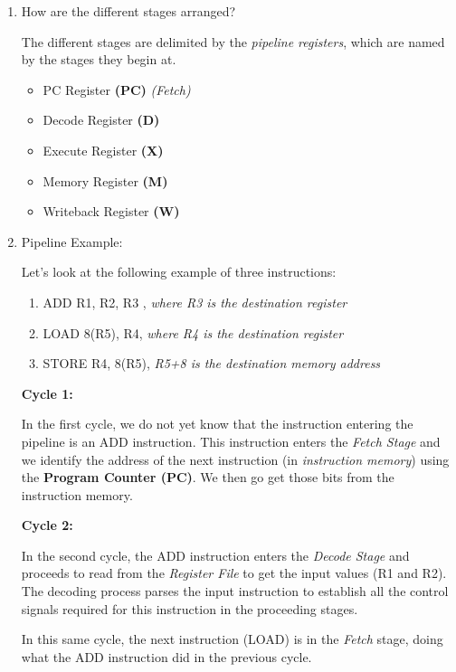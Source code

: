 \documentclass[12pt]{article}
\newenvironment{QandA}{\begin{enumerate}[label=\bfseries\alph*.]\bfseries}
                      {\end{enumerate}}
\newenvironment{answered}{\par\quad\normalfont}{}
\begin{document}
\begin{QandA}
    \item How are the different stages arranged?
    \begin{answered}
    The different stages are delimited by the \textit{pipeline registers}, which are named by the stages they begin at.
    \begin{itemize}
        \item PC Register \textbf{(PC)} \textit{(Fetch)}
        \item Decode Register \textbf{(D)}
        \item Execute Register \textbf{(X)}
        \item Memory Register \textbf{(M)}
        \item Writeback Register \textbf{(W)}
    \end{itemize}
    \end{answered}
    
    \item Pipeline Example:
    \begin{answered}
    Let's look at the following example of three instructions:
    \begin{enumerate}
        \item ADD R1, R2, R3 , \textit{where R3 is the destination register}
        \item LOAD 8(R5), R4, \textit{where R4 is the destination register}
        \item STORE R4, 8(R5), \textit{R5+8 is the destination memory address}
    \end{enumerate}
    
    \textbf{Cycle 1:} 
    
    In the first cycle, we do not yet know that the instruction entering the pipeline is an ADD instruction. This instruction enters the \textit{Fetch Stage} and we identify the address of the next instruction (in \textit{instruction memory}) using the \textbf{Program Counter (PC)}. We then go get those bits from the instruction memory.
    
    \textbf{Cycle 2:} 
    
    In the second cycle, the ADD instruction enters the \textit{Decode Stage} and proceeds to read from the \textit{Register File} to get the input values (R1 and R2). The decoding process parses the input instruction to establish all the control signals required for this instruction in the proceeding stages.
    
    \quad In this same cycle, the next instruction (LOAD) is in the \textit{Fetch} stage, doing what the ADD instruction did in the previous cycle.
    

\end{answered}
\end{QandA}
\end{document}
